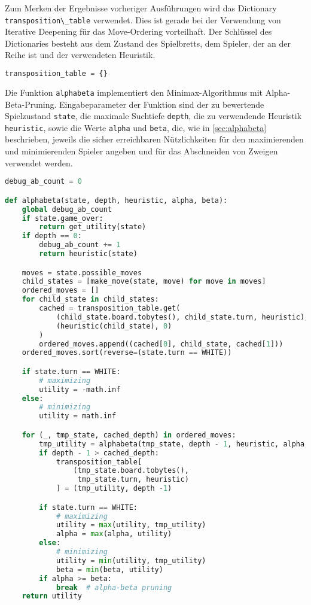 Zum Merken der Ergebnisse vorheriger Ausführungen wird das Dictionary
\passthrough{\lstinline!transposition\_table!} verwendet. Dies ist
gerade bei der Verwendung von Iterative Deepening für das Move-Ordering
vorteilhaft. Der Schlüssel des Dictionaries besteht aus dem Zustand des
Spielbretts, dem Spieler, der an der Reihe ist und der verwendeten
Heuristik.

\begin{lstlisting}[language=Python]
transposition_table = {}
\end{lstlisting}

Die Funktion \passthrough{\lstinline!alphabeta!} implementiert den
Minimax-Algorithmus mit Alpha-Beta-Pruning. Eingabeparameter der
Funktion sind der zu bewertende Spielzustand
\passthrough{\lstinline!state!}, die maximale Suchtiefe
\passthrough{\lstinline!depth!}, die zu verwendende Heuristik
\passthrough{\lstinline!heuristic!}, sowie die Werte
\passthrough{\lstinline!alpha!} und \passthrough{\lstinline!beta!}, die,
wie in \autoref{sec:alphabeta} beschrieben, jeweils die sicher
erreichbaren Nützlichkeiten für den maximierenden und minimierenden
Spieler angeben und für das Abschneiden von Zweigen verwendet werden.

\begin{lstlisting}[language=Python]
debug_ab_count = 0

def alphabeta(state, depth, heuristic, alpha, beta):
    global debug_ab_count
    if state.game_over:
        return get_utility(state)
    if depth == 0:
        debug_ab_count += 1
        return heuristic(state)

    moves = state.possible_moves
    child_states = [make_move(state, move) for move in moves]
    ordered_moves = []
    for child_state in child_states:
        cached = transposition_table.get(
            (child_state.board.tobytes(), child_state.turn, heuristic),
            (heuristic(child_state), 0)
        )
        ordered_moves.append((cached[0], child_state, cached[1]))
    ordered_moves.sort(reverse=(state.turn == WHITE))

    if state.turn == WHITE:
        # maximizing
        utility = -math.inf
    else:
        # minimizing
        utility = math.inf

    for (_, tmp_state, cached_depth) in ordered_moves:
        tmp_utility = alphabeta(tmp_state, depth - 1, heuristic, alpha, beta)
        if depth - 1 > cached_depth:
            transposition_table[
                (tmp_state.board.tobytes(),
                 tmp_state.turn, heuristic)
            ] = (tmp_utility, depth -1)

        if state.turn == WHITE:
            # maximizing
            utility = max(utility, tmp_utility)
            alpha = max(alpha, utility)
        else:
            # minimizing
            utility = min(utility, tmp_utility)
            beta = min(beta, utility)
        if alpha >= beta:
            break  # alpha-beta pruning
    return utility
\end{lstlisting}

